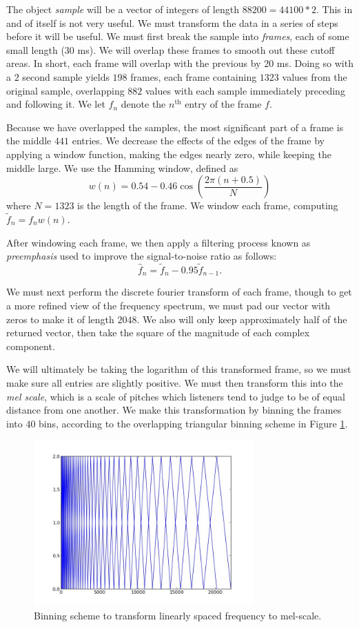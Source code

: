 The object \emph{sample} will be a vector of integers of length $88200 = 44100*2$. This in and of itself is not very useful. We must transform the data in a series of steps before it will be useful. We must first break the sample into \emph{frames}, each of some small length ($30$ ms). We will overlap these frames to smooth out these cutoff areas. In short, each frame will overlap with the previous by $20$ ms. Doing so with a $2$ second sample yields $198$ frames, each frame containing $1323$ values from the original sample, overlapping $882$ values with each sample immediately preceding and following it. We let $f_{n}$ denote the $n^{\text{th}}$ entry of the frame $f$.

Because we have overlapped the samples, the most significant part of a frame is the middle $441$ entries. We decrease the effects of the edges of the frame by applying a window function, making the edges nearly zero, while keeping the middle large. We use the Hamming window, defined as 
$$w(n) = 0.54 - 0.46 \cos \left( \frac{2\pi (n + 0.5)}{N} \right)$$
where $N = 1323$ is the length of the frame. We window each frame, computing $\tilde{f}_{n} = f_{n}w(n)$.

After windowing each frame, we then apply a filtering process known as \emph{preemphasis} used to improve the signal-to-noise ratio as follows:
$$\widehat{f}_{n} = \tilde{f}_{n} - 0.95 \tilde{f}_{n-1}.$$

We must next perform the discrete fourier transform of each frame, though to get a more refined view of the frequency spectrum, we must pad our vector with zeros to make it of length $2048$. We also will only keep approximately half of the returned vector, then take the square of the magnitude of each complex component.

We will ultimately be taking the logarithm of this transformed frame, so we must make sure all entries are slightly positive. We must then transform this into the \emph{mel scale}, which is a scale of pitches which listeners tend to judge to be of equal distance from one another. We make this transformation by binning the frames into $40$ bins, according to the overlapping triangular binning scheme in Figure \ref{binning}.

\begin{figure}
\begin{center}
\includegraphics[height=2.5in]{melfilterbank.jpeg}
\end{center}
\caption{Binning scheme to transform linearly spaced frequency to mel-scale.}\label{binning}
\end{figure}

